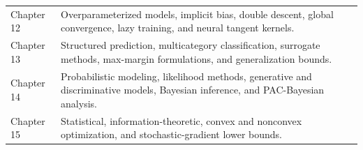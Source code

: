 \begin{table}[htbp]
\begin{tabularx}{\textwidth}{
  @{}>{\raggedright\arraybackslash}p{}
  >{\raggedright\arraybackslash}X@{}}
Chapter 12 &
Overparameterized models, implicit bias, double descent, global convergence, lazy training, and neural tangent kernels. \\

Chapter 13 &
Structured prediction, multicategory classification, surrogate methods, max-margin formulations, and generalization bounds. \\

Chapter 14 &
Probabilistic modeling, likelihood methods, generative and discriminative models, Bayesian inference, and PAC-Bayesian analysis. \\

Chapter 15 &
Statistical, information-theoretic, convex and nonconvex optimization, and stochastic-gradient lower bounds. \\
\bottomrule
\end{tabularx}
\end{table}
